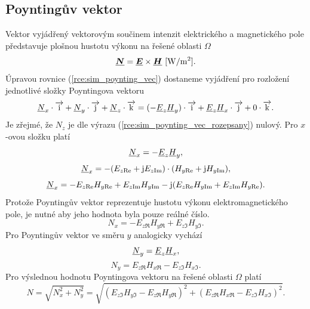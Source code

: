 \subsection*{Poyntingův vektor}
Vektor vyjádřený vektorovým součinem intenzit elektrického a magnetického pole představuje plošnou hustotu výkonu na řešené oblasti $\Omega$
\begin{equation}
	\mbox{\underline{\boldmath$N$}} = \mbox{\underline{\boldmath$E$}} \times\mbox{\underline{\boldmath$H$}}\mathrm{\ [W/m^{2}]}.
	\label{rce:sim_poynting_vec}
\end{equation}
Úpravou rovnice (\ref{rce:sim_poynting_vec}) dostaneme vyjádření pro rozložení jednotlivé složky Poyntingova vektoru
\begin{equation}
	{\underline{N}}_x \cdot\overrightarrow{\mathrm{i}} + {\underline{N}}_y \cdot\overrightarrow{\mathrm{j}} + {\underline{N}}_z \cdot\overrightarrow{\mathrm{k}} = (-{\underline{E}}_z {\underline{H}}_y) \cdot\overrightarrow{\mathrm{i}} + {\underline{E}}_z {\underline{H}}_x \cdot\overrightarrow{\mathrm{j}} + 0 \cdot\overrightarrow{\mathrm{k}}.
	\label{rce:sim_poynting_vec_rozepsany}
\end{equation}
Je zřejmé, že $N_z$ je dle výrazu (\ref{rce:sim_poynting_vec_rozepsany}) nulový. Pro $x$-ovou složku platí
\begin{displaymath}
	{\underline{N}}_x = -{\underline{E}}_z {\underline{H}}_y,
\end{displaymath}
\begin{displaymath}
	{\underline{N}}_x = -(E_{z\mathrm{Re}} + \mathrm{j} E_{z\mathrm{Im}})\cdot (H_{y\mathrm{Re}} + \mathrm{j} H_{y\mathrm{Im}}),
\end{displaymath}
\begin{displaymath}
	{\underline{N}}_x = - E_{z\mathrm{Re}} H_{y\mathrm{Re}} + E_{z\mathrm{Im}} H_{y\mathrm{Im}} - \mathrm{j} (E_{z\mathrm{Re}} H_{y\mathrm{Im}} + E_{z\mathrm{Im}} H_{y\mathrm{Re}}).
\end{displaymath}
Protože Poyntingův vektor reprezentuje hustotu výkonu elektromagnetického pole, je nutné aby jeho hodnota byla pouze reálné číslo.
\begin{displaymath}
	N_x = - E_{z\Re} H_{y\Re} + E_{z\Im} H_{y\Im}.
\end{displaymath}
Pro Poyntingův vektor ve směru $y$ analogicky vychází
\begin{displaymath}
	{\underline{N}}_y = {\underline{E}}_z {\underline{H}}_x,
\end{displaymath}
\begin{displaymath}
	N_y = E_{z\Re} H_{x\Re} - E_{z\Im} H_{x\Im}.
\end{displaymath}
Pro výslednou hodnotu Poyntingova vektoru na řešené oblasti $\Omega$ platí
\begin{displaymath}
	N = \sqrt{N_{x}^{2} + N_{y}^{2}} = \sqrt{(E_{z\Im} H_{y\Im} - E_{z\Re} H_{y\Re})^{2} + (E_{z\Re} H_{x\Re} - E_{z\Im} H_{x\Im})^{2}}.
\end{displaymath}

